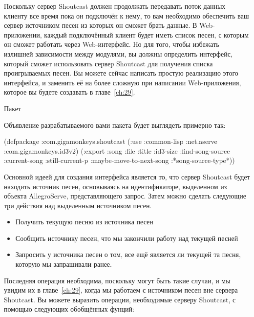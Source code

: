 Поскольку сервер Shoutcast должен продолжать передавать поток данных клиенту все время
пока он подключён к нему, то вам необходимо обеспечить ваш сервер источником песен из
которых он сможет брать данные.  В Web-приложении, каждый подключённый клиент будет иметь
список песен, с которым он сможет работать через Web-интерфейс.  Но для того, чтобы
избежать излишней зависимости между модулями, вы должны определить интерфейс, который
сможет использовать сервер Shoutcast для получения списка проигрываемых песен. Вы можете
сейчас написать простую реализацию этого интерфейса, и заменить её на более сложную при
написании Web-приложения, которое вы будете создавать в главе~\ref{ch:29}.


Пакет

Объявление разрабатываемого вами пакета будет выглядеть примерно так:

\begin{myverb}
(defpackage :com.gigamonkeys.shoutcast
  (:use :common-lisp 
        :net.aserve 
        :com.gigamonkeys.id3v2)
  (:export :song
           :file
           :title
           :id3-size
           :find-song-source
           :current-song
           :still-current-p
           :maybe-move-to-next-song
           :*song-source-type*))
\end{myverb}


Основной идеей для создания интерфейса является то, что сервер Shoutcast будет находить
источник песен, основываясь на идентификаторе, выделенном из объекта AllegroServe,
представляющего запрос.  Затем можно сделать следующие три действия над выделенным
источником песен.

\begin{itemize}
\item Получить текущую песню из источника песен
\item Сообщить источнику песен, что мы закончили работу над текущей песней
\item Запросить у источника песен о том, все ещё является ли текущей та песня, которую мы
  запрашивали ранее.
\end{itemize}

Последняя операция необходима, поскольку могут быть такие случаи, и мы увидим их в
главе~\ref{ch:29}, когда мы работаем с источником песен вне сервера Shoutcast.  Вы можете
выразить операции, необходимые серверу Shoutcast, с помощью следующих обобщённых фунций:

